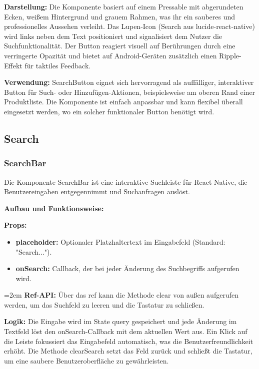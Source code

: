 \documentclass[12pt, a4paper]{report} %
\begin{document}
\textbf{Darstellung:}
Die Komponente basiert auf einem Pressable mit abgerundeten Ecken, weißem Hintergrund und grauem Rahmen, was ihr ein sauberes und professionelles Aussehen verleiht. Das Lupen-Icon (Search aus lucide-react-native) wird links neben dem Text positioniert und signalisiert dem Nutzer die Suchfunktionalität. Der Button reagiert visuell auf Berührungen durch eine verringerte Opazität und bietet auf Android-Geräten zusätzlich einen Ripple-Effekt für taktiles Feedback.

\noindent\textbf{Verwendung:} SearchButton eignet sich hervorragend als auffälliger, interaktiver Button für Such- oder Hinzufügen-Aktionen, beispielsweise am oberen Rand einer Produktliste. Die Komponente ist einfach anpassbar und kann flexibel überall eingesetzt werden, wo ein solcher funktionaler Button benötigt wird.

\subsection{Search}

\subsubsection{SearchBar}
Die Komponente SearchBar ist eine interaktive Suchleiste für React Native, die Benutzereingaben entgegennimmt und Suchanfragen auslöst.

\noindent\textbf{Aufbau und Funktionsweise:}

\textbf{Props:}
\begin{itemize}
    \item \textbf{placeholder:} Optionaler Platzhaltertext im Eingabefeld (Standard: "Search...").
    \item \textbf{onSearch:} Callback, der bei jeder Änderung des Suchbegriffs aufgerufen wird.
\end{itemize}

\hangindent=2em
\textbf{Ref-API:}
Über das ref kann die Methode clear von außen aufgerufen werden, um das Suchfeld zu leeren und die Tastatur zu schließen.

\textbf{Logik:}
Die Eingabe wird im State query gespeichert und jede Änderung im Textfeld löst den onSearch-Callback mit dem aktuellen Wert aus. Ein Klick auf die Leiste fokussiert das Eingabefeld automatisch, was die Benutzerfreundlichkeit erhöht. Die Methode clearSearch setzt das Feld zurück und schließt die Tastatur, um eine saubere Benutzeroberfläche zu gewährleisten.
\end{document}
